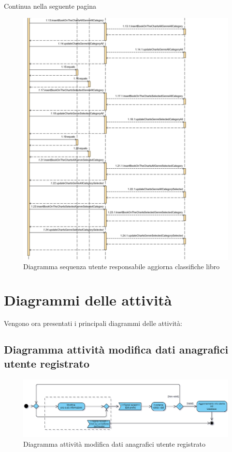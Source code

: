 \documentclass[a4paper,11pt]{report}
\begin{document}
    Continua nella seguente pagina
    \clearpage
\begin{figure}[h!]
	\centering
    	\hspace*{+0.3in}
	\includegraphics[width=1.2\linewidth]{Sequence diagrams/3 Manager/update2.png}
	\caption{Diagramma sequenza utente responsabile aggiorna classifiche libro}
\end{figure}

\clearpage

\chapter{Diagrammi delle attività}

Vengono ora presentati i principali diagrammi delle attività:
\section{Diagramma attività modifica dati anagrafici utente registrato}
\vspace{0.5in}
\begin{figure}[h!]
	\centering
    	\hspace*{-0.5in}
	\includegraphics[width=1.3\linewidth]{Activity diagrams/activity diagram modifica indirizzo.png}
	\caption{Diagramma attività modifica dati anagrafici utente registrato}
\end{figure}
\clearpage
\end{document}
